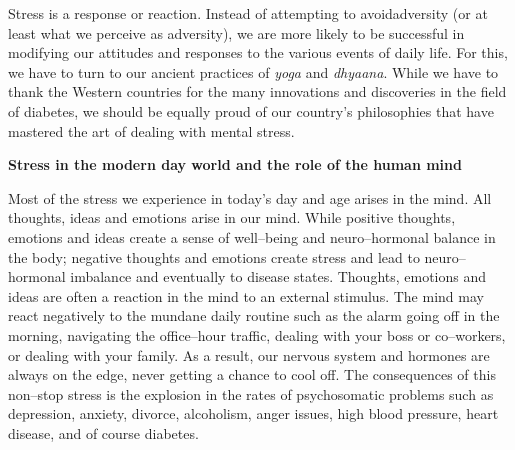 Stress is a response or reaction. Instead of attempting to avoid\break adversity (or at least what we perceive as adversity), we are more likely to be successful in modifying our attitudes and responses to the various events of daily life. For this, we have to turn to our ancient practices of \textit{yoga} and \textit{dhyaana}. While we have to thank the Western countries for the many innovations and discoveries in the field of diabetes, we should be equally proud of our country’s philosophies that have mastered the art of dealing with mental stress.

\noindent\textbf{Stress in the modern day world and the role of the human mind}

Most of the stress we experience in today’s day and age arises in the mind. All thoughts, ideas and emotions arise in our mind. While positive thoughts, emotions and ideas create a sense of well–being and neuro–hormonal balance in the body; negative thoughts and emotions create stress and lead to neuro–hormonal imbalance and eventually to disease states. Thoughts, emotions and ideas are often a reaction in the mind to an external stimulus. The mind may react negatively to the mundane daily routine such as the alarm going off in the morning, navigating the office–hour traffic, dealing with your boss or co–workers, or dealing with your family. As a result, our nervous system and hormones are always on the edge, never getting a chance to cool off. The consequences of this non–stop stress is the explosion in the rates of psychosomatic problems such as depression, anxiety, divorce, alcoholism, anger issues, high blood pressure, heart disease, and of course diabetes.

